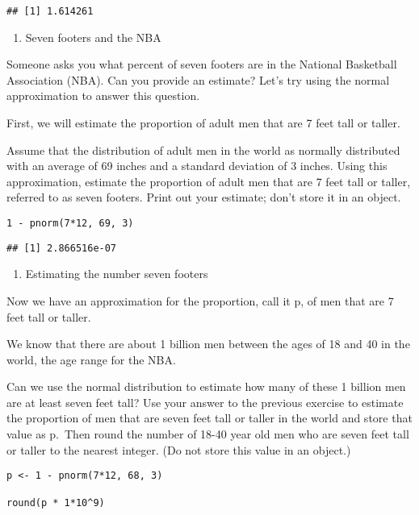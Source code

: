 \documentclass[]{article}
\providecommand{\tightlist}{%
  \setlength{\itemsep}{0pt}\setlength{\parskip}{0pt}}
\begin{document}
\begin{verbatim}
## [1] 1.614261
\end{verbatim}

\begin{enumerate}
\def\labelenumi{\arabic{enumi}.}
\setcounter{enumi}{3}
\tightlist
\item
  Seven footers and the NBA
\end{enumerate}

Someone asks you what percent of seven footers are in the National
Basketball Association (NBA). Can you provide an estimate? Let's try
using the normal approximation to answer this question.

First, we will estimate the proportion of adult men that are 7 feet tall
or taller.

Assume that the distribution of adult men in the world as normally
distributed with an average of 69 inches and a standard deviation of 3
inches. Using this approximation, estimate the proportion of adult men
that are 7 feet tall or taller, referred to as seven footers. Print out
your estimate; don't store it in an object.

\begin{verbatim}
1 - pnorm(7*12, 69, 3)
\end{verbatim}

\begin{verbatim}
## [1] 2.866516e-07
\end{verbatim}

\begin{enumerate}
\def\labelenumi{\arabic{enumi}.}
\setcounter{enumi}{4}
\tightlist
\item
  Estimating the number seven footers
\end{enumerate}

Now we have an approximation for the proportion, call it p, of men that
are 7 feet tall or taller.

We know that there are about 1 billion men between the ages of 18 and 40
in the world, the age range for the NBA.

Can we use the normal distribution to estimate how many of these 1
billion men are at least seven feet tall? Use your answer to the
previous exercise to estimate the proportion of men that are seven feet
tall or taller in the world and store that value as p.~Then round the
number of 18-40 year old men who are seven feet tall or taller to the
nearest integer. (Do not store this value in an object.)

\begin{verbatim}
p <- 1 - pnorm(7*12, 68, 3)

round(p * 1*10^9)
\end{verbatim}
\end{document}
